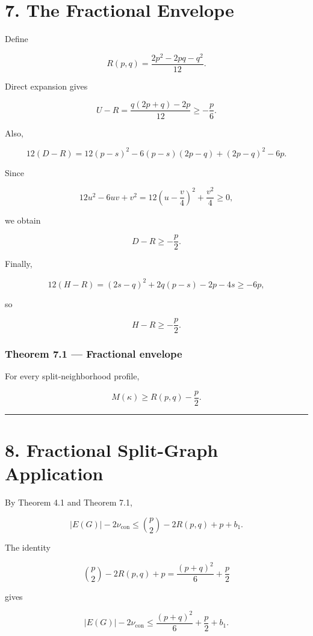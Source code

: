 \documentclass[11pt,a4paper]{article}
\begin{document}
\section{7. The Fractional Envelope}\label{the-fractional-envelope}

Define

\[
R(p,q)=\frac{2p^2-2pq-q^2}{12}.
\tag{7.1}
\]

Direct expansion gives

\[
U-R=\frac{q(2p+q)-2p}{12}\ge-\frac p6.
\tag{7.2}
\]

Also,

\[
12(D-R)
=
12(p-s)^2-6(p-s)(2p-q)+(2p-q)^2-6p.
\]

Since

\[
12u^2-6uv+v^2
=
12\left(u-\frac v4\right)^2+\frac{v^2}{4}\ge0,
\]

we obtain

\[
D-R\ge-\frac p2.
\tag{7.3}
\]

Finally,

\[
12(H-R)
=
(2s-q)^2+2q(p-s)-2p-4s
\ge-6p,
\]

so

\[
H-R\ge-\frac p2.
\tag{7.4}
\]

\subsubsection{Theorem 7.1 --- Fractional envelope}\label{theorem-7.1-fractional-envelope}

For every split-neighborhood profile,

\[
\boxed{
M(\kappa)\ge R(p,q)-\frac p2.
}
\tag{7.5}
\]

\begin{center}\rule{0.5\linewidth}{0.5pt}\end{center}

\section{8. Fractional Split-Graph Application}\label{fractional-split-graph-application}

By Theorem 4.1 and Theorem 7.1,

\[
|E(G)|-2\nu_{\mathrm{con}}
\le
\binom p2-2R(p,q)+p+b_1.
\]

The identity

\[
\binom p2-2R(p,q)+p
=
\frac{(p+q)^2}{6}+\frac p2
\]

gives

\[
|E(G)|-2\nu_{\mathrm{con}}
\le
\frac{(p+q)^2}{6}+\frac p2+b_1.
\]
\end{document}
